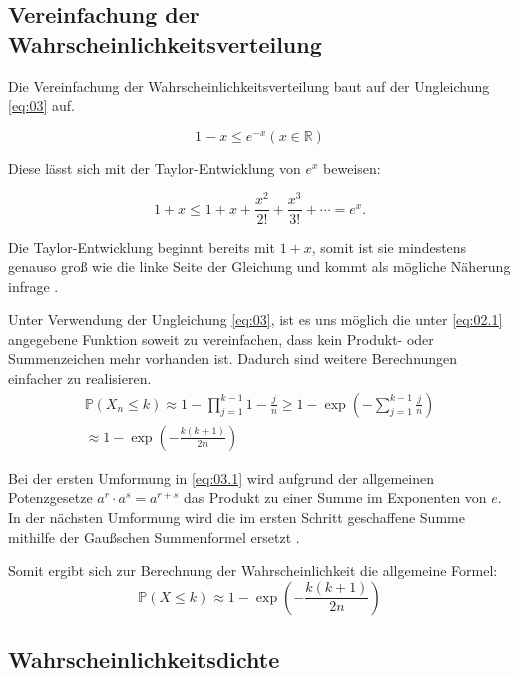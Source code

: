 \documentclass[../main.tex]{subfiles}
\begin{document}
\begin{flushleft}
\subsection{Vereinfachung der Wahrscheinlichkeitsverteilung}

Die Vereinfachung der Wahrscheinlichkeitsverteilung baut auf der Ungleichung \ref{eq:03} auf.

\begin{equation}
1 - x \leq e^{ -x } (x \in \mathbb{R}) \label{eq:03}
\end{equation}

Diese lässt sich mit der Taylor-Entwicklung von $e^x$ beweisen:

\begin{equation}
1 + x \leq 1 + x + \frac{x^2}{2!} + \frac{x^3}{3!} + \cdots = e^x.
\end{equation}

Die Taylor-Entwicklung beginnt bereits mit $1+x$, somit ist sie mindestens genauso groß wie die linke Seite der Gleichung und kommt als mögliche Näherung infrage \cite[560ff]{papula}. \newline

Unter Verwendung der Ungleichung \ref{eq:03}, ist es uns möglich die unter \ref{eq:02.1} angegebene Funktion soweit zu vereinfachen, dass kein Produkt- oder Summenzeichen mehr vorhanden ist.
Dadurch sind weitere Berechnungen einfacher zu realisieren.
\begin{eqnarray}
\mathbb{P}(X_{ n } \leq k) \approx 1 - \prod_{ j = 1 }^{ k - 1 }{ 1 - \frac{ j }{ n } } \geq 1 - \exp( - \sum_{ j = 1 }^{ k - 1 }{ \frac{ j }{ n } } )  \label{eq:03.1}\\
\approx 1 - \exp( - \frac{ k (k + 1) }{ 2n } )  \label{eq:03.2}
\end{eqnarray}

Bei der ersten Umformung in \ref{eq:03.1} wird aufgrund der allgemeinen Potenzgesetze  $a^{ r } \cdot a^{ s } = a^{ r + s }$ \cite[267]{papula} das Produkt zu einer Summe im Exponenten von $e$. In der nächsten Umformung wird die im ersten Schritt geschaffene Summe mithilfe der Gaußschen Summenformel ersetzt \cite[9ff]{petkovsek1996b}. \newline

Somit ergibt sich zur Berechnung der Wahrscheinlichkeit die allgemeine Formel:
\begin{equation}
\mathbb{P}(X \leq k) \approx 1 - \exp( - \frac{ k (k + 1) }{ 2n } ) \label{eq:04}
\end{equation}
\subsection{Wahrscheinlichkeitsdichte}


\end{flushleft}
\end{document}
